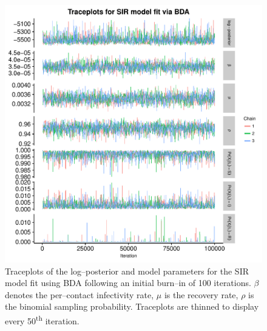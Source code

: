 \begin{figure}[htbp]
	\centering
	\includegraphics[width=0.9\linewidth]{figures/misspec_sir_bda_traceplots.pdf}
	\caption[Simulation 2 MCMC traceplots for SIR model parameters fit using Bayesian data augmentation.]{Traceplots of the log--posterior and model parameters for the SIR model fit using BDA following an initial burn--in of 100 iterations. $ \beta $ denotes the per--contact infectivity rate, $ \mu $ is the recovery rate, $ \rho $ is the binomial sampling probability. Traceplots are thinned to display every 50\textsuperscript{th} iteration.}
	\label{fig:misspec_sir_bda_traceplots}
\end{figure}

